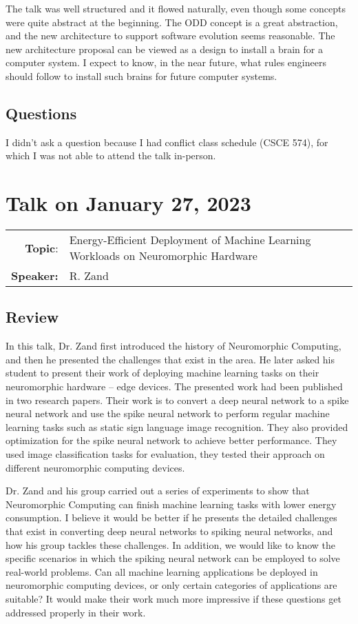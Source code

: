 \documentclass[11pt, oneside]{article}   	%
\begin{document}
The talk was well structured and it flowed naturally, even though some concepts were quite abstract at the beginning. The ODD concept is a great abstraction, and the new architecture to support software evolution seems reasonable. The new architecture proposal can be viewed as a design to install a brain for a computer system. I expect to know, in the near future, what rules engineers should follow to install such brains for future computer systems.

\subsection{Questions}
I didn't ask a question because I had conflict class schedule (CSCE 574), for which I was not able to attend the talk in-person.

\newpage
\section{Talk on January 27, 2023}
\begin{tabularx} {\textwidth}{r X}
\textbf{Topic}: & Energy-Efficient Deployment of Machine Learning Workloads on Neuromorphic Hardware \\
\textbf{Speaker:} & R. Zand\\
\end{tabularx}

\subsection{Review}
In this talk, Dr. Zand first introduced the history of Neuromorphic Computing, and then he presented the challenges that exist in the area. He later asked his student to present their work of deploying machine learning tasks on their neuromorphic hardware -- edge devices. The presented work had been published in two research papers. Their work is to convert a deep neural network to a spike neural network and use the spike neural network to perform regular machine learning tasks such as static sign language image recognition. They also provided optimization for the spike neural network to achieve better performance. They used image classification tasks for evaluation, they tested their approach on different neuromorphic computing devices. 

Dr. Zand and his group carried out a series of experiments to show that Neuromorphic Computing can finish machine learning tasks with lower energy consumption. I believe it would be better if he presents the detailed challenges that exist in converting deep neural networks to spiking neural networks, and how his group tackles these challenges. In addition, we would like to know the specific scenarios in which the spiking neural network can be employed to solve real-world problems. Can all machine learning applications be deployed in neuromorphic computing devices, or only certain categories of applications are suitable? It would make their work much more impressive if these questions get addressed properly in their work.
\end{document}

